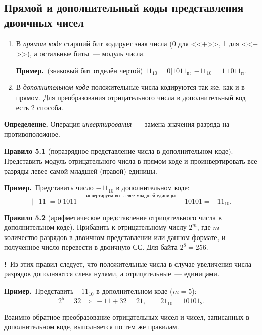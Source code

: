 \documentclass[a4paper,11pt]{article}
\newcommand{\imp}{\textbf{\color{red!70!black}!}\ }
\newcommand{\prim}{\textbf{Пример.}\ }
\begin{document}
\subsection{Прямой и дополнительный коды представления двоичных чисел}

\begin{enumerate}[label=\arabic*)]
\item В \emph{прямом коде} старший бит кодирует знак числа (0 для <<$+$>>, 1 для <<$-$>>), а остальные
биты~--- модуль числа.

\prim (знаковый бит отделён чертой) \quad $11_{10} = 0|1011_{\text{п}}$, \qquad $-11_{10} = 1|1011_{\text{п}}$.

\item В \emph{дополнительном коде} положительные числа кодируются так же, как и в прямом. Для
преобразования отрицательного числа в дополнительный код есть 2 способа.
\end{enumerate}

\begin{opr}
\textbf{Определение.} Операция \emph{инвертирования}~--- замена значения разряда на противоположное.
\end{opr}

\begin{opr}
\textbf{Правило 5.1} (поразрядное представление числа в дополнительном коде).
Представить модуль отрицательного числа в прямом коде и проинвертировать все разряды левее самой
младшей (правой) единицы.
\end{opr}

\prim Представить число $-11_{10}$ в дополнительном коде:
\[
  |{-11}| = 0|1011 \quad\xrightarrow{\text{инвертируем всё левее младшей единицы}}\quad 10101 = -11_{10}.
\]

\begin{opr}
\textbf{Правило 5.2} (арифметическое представление отрицательного числа в дополнительном коде).
Прибавить к отрицательному числу $2^m$, где $m$~--- количество разрядов в двоичном представлении
или данном формате, и полученное число перевести в двоичную СС. Для байта $2^8 = 256$.
\end{opr}

\imp Из этих правил следует, что положительные числа в случае увеличения числа разрядов дополняются
слева нулями, а отрицательные~--- единицами.

\prim Представить $-11_{10}$ в дополнительном коде ($m = 5$):
\[
  2^5 = 32 \ \Rightarrow\ -11 + 32 = 21, \qquad 21_{10} = 10101_2.
\]

Взаимно обратное преобразование отрицательных чисел и чисел, записанных в дополнительном коде,
выполняется по тем же правилам.
\end{document}

